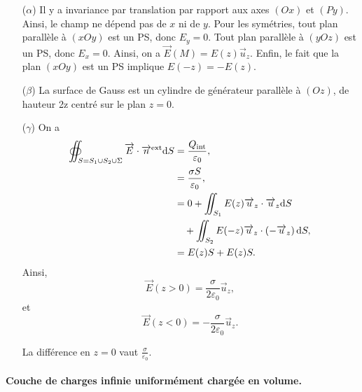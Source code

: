             \begin{itemize}
                \item [($\alpha$)] Il y a invariance par translation par rapport aux axes $(Ox)$ et $(Py)$. Ainsi, le champ ne dépend pas de $x$ ni de $y$. Pour les symétries, tout plan parallèle à $(xOy)$ est un PS, donc $E_y=0$. Tout plan parallèle à $(yOz)$ est un PS, donc $E_x=0$. Ainsi, on a $\vec{E}(M)=E(z)\vec{u}_z$.
                Enfin, le fait que la plan $(xOy)$ est un PS implique $E(-z)=-E(z)$.

                \item [($\beta$)] La surface de Gauss est un cylindre de générateur parallèle à $(Oz)$, de hauteur 2z centré sur le plan $z=0$.
                
                \item [($\gamma$)] On a 
                \begin{align*}
                    \oiint_{S=S_1\cup S_2\cup \Sigma}\protect\overrightarrow{{E}}\cdot\protect\overrightarrow{{n}}^{\text{ext}}\mathrm{d} S
                    &=\frac{Q_{\text{int}}}{\varepsilon_0},\\
                    &=\frac{\sigma S}{\varepsilon_0},\\
                    &=0+\iint_{S_1}E(z)\protect\overrightarrow{{u}}_z\cdot\protect\overrightarrow{{u}}_z\mathrm{d} S\\
                    &\quad+\iint_{S_2}E(-z)\protect\overrightarrow{{u}}_z\cdot\left(-\protect\overrightarrow{{u}}_z\right)\mathrm{d} S,\\
                    &=
                    E(z)S+E(z)S.
                \end{align*}
                Ainsi, 
                \begin{equation*}
                    \boxed{\vec{E}(z>0)=\frac{\sigma}{2\varepsilon_0}\vec{u}_z,}
                \end{equation*}
                et 
                \begin{equation*}
                    \boxed{\vec{E}(z<0)=-\frac{\sigma}{2\varepsilon_0}\vec{u}_z.}
                \end{equation*}
                
                La différence en $z=0$ vaut $\frac{\sigma}{\varepsilon_0}$.
            \end{itemize}

            \paragraph{Couche de charges infinie uniformément chargée en volume.}

